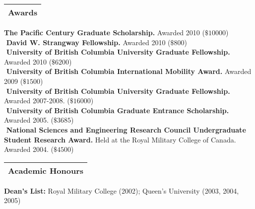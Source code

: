 \documentclass[letterpaper,12pt]{article}
\begin{document}
\noindent \Large \begin{tabular}{|p{12cm}|} \hline \textbf{Awards}\\ \hline \end{tabular} \normalsize
\linebreak
\linebreak
\noindent \textbf {The Pacific Century Graduate Scholarship.} Awarded 2010 ($\$10000$)\\
$ $ \linebreak
$ $\noindent \textbf {David W. Strangway Fellowship.} Awarded 2010 ($\$800$)\\
$ $ \linebreak
$ $\noindent \textbf {University of British Columbia University Graduate Fellowship.} Awarded 2010 ($\$6200$)\\
$ $ \linebreak
$ $\noindent \textbf {University of British Columbia International Mobility Award.} Awarded 2009 ($\$1500$)\\
$ $ \linebreak
\noindent \textbf {University of British Columbia University Graduate Fellowship.} Awarded 2007-2008. ($\$16000$)\\
$ $\linebreak
\noindent \textbf {University of British Columbia Graduate Entrance Scholarship.} Awarded 2005. ($\$3685$)\\
$ $\linebreak
\noindent \textbf {National Sciences and Engineering Research Council Undergraduate Student Research Award.} Held at the Royal Military College of Canada. Awarded 2004. ($\$4500$)\\
$ $ \linebreak

\noindent \Large \begin{tabular}{|p{12cm}|} \hline \textbf{Academic Honours}\\ \hline \end{tabular} \normalsize
\linebreak
\linebreak
\noindent \textbf {Dean's List:} Royal Military College (2002); Queen's University (2003, 2004, 2005)\\


\end{document}

